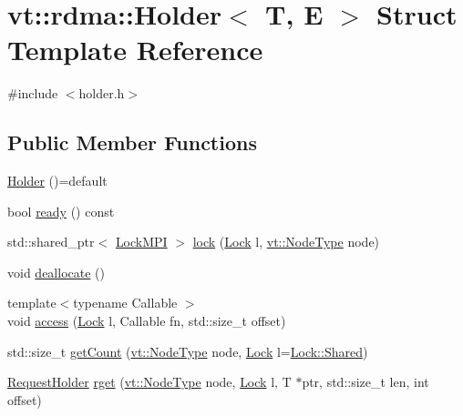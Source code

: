 \hypertarget{structvt_1_1rdma_1_1_holder}{}\section{vt\+:\+:rdma\+:\+:Holder$<$ T, E $>$ Struct Template Reference}
\label{structvt_1_1rdma_1_1_holder}


{\ttfamily \#include $<$holder.\+h$>$}

\subsection*{Public Member Functions}
\begin{DoxyCompactItemize}
\item 
\hyperlink{structvt_1_1rdma_1_1_holder_aa0d947b72bd66a1a0507062f3dffd590}{Holder} ()=default
\item 
bool \hyperlink{structvt_1_1rdma_1_1_holder_a61b649c8c420b9f2f6310d752bdef79c}{ready} () const
\item 
std\+::shared\+\_\+ptr$<$ \hyperlink{structvt_1_1rdma_1_1_lock_m_p_i}{Lock\+M\+PI} $>$ \hyperlink{structvt_1_1rdma_1_1_holder_a31433de5996d42f49a16fe0f05bd51cf}{lock} (\hyperlink{namespacevt_1_1rdma_ac5c20b41a653e520b6305d4d454ecb70}{Lock} l, \hyperlink{namespacevt_a866da9d0efc19c0a1ce79e9e492f47e2}{vt\+::\+Node\+Type} node)
\item 
void \hyperlink{structvt_1_1rdma_1_1_holder_afe6dd03862a68f941a44258aac9ef03d}{deallocate} ()
\item 
{\footnotesize template$<$typename Callable $>$ }\\void \hyperlink{structvt_1_1rdma_1_1_holder_a352b9ae14f0f60cee7df78231d2debfe}{access} (\hyperlink{namespacevt_1_1rdma_ac5c20b41a653e520b6305d4d454ecb70}{Lock} l, Callable fn, std\+::size\+\_\+t offset)
\item 
std\+::size\+\_\+t \hyperlink{structvt_1_1rdma_1_1_holder_a13c46ec783f1df901cfd7db7f65e0e85}{get\+Count} (\hyperlink{namespacevt_a866da9d0efc19c0a1ce79e9e492f47e2}{vt\+::\+Node\+Type} node, \hyperlink{namespacevt_1_1rdma_ac5c20b41a653e520b6305d4d454ecb70}{Lock} l=\hyperlink{namespacevt_1_1rdma_ac5c20b41a653e520b6305d4d454ecb70aa6156ea9d66fef24e87e841fbabf7cca}{Lock\+::\+Shared})
\item 
\hyperlink{structvt_1_1rdma_1_1_request_holder}{Request\+Holder} \hyperlink{structvt_1_1rdma_1_1_holder_abca462aa3e98d1c0fb4852743eaed04a}{rget} (\hyperlink{namespacevt_a866da9d0efc19c0a1ce79e9e492f47e2}{vt\+::\+Node\+Type} node, \hyperlink{namespacevt_1_1rdma_ac5c20b41a653e520b6305d4d454ecb70}{Lock} l, T $\ast$ptr, std\+::size\+\_\+t len, int offset)

\end{DoxyCompactItemize}
